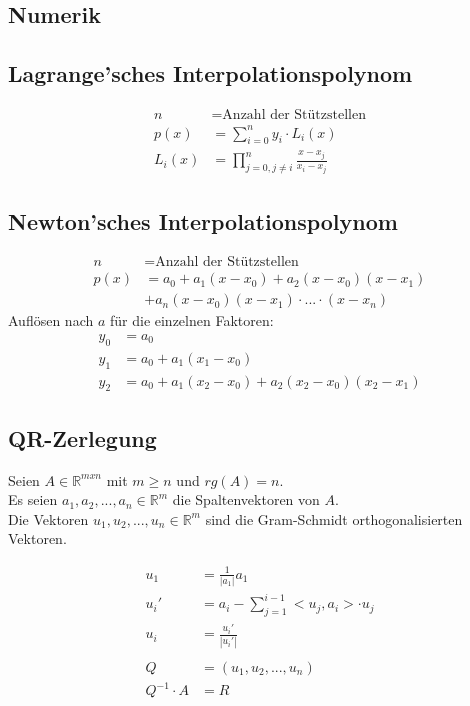 \documentclass[a4paper, landscape, 10pt]{article}
\begin{document}
\begin{multicols}{4}
\begin{small}
	\section{Numerik}
		\subsection{Lagrange'sches Interpolationspolynom}
			\begin{align*}
			n &= \text{Anzahl der Stützstellen}\\
			p(x) &= \sum_{i=0}^{n} y_i \cdot L_i(x) \\
			L_i(x) &= \prod_{j = 0, j \neq i}^{n} \frac{x - x_j}{x_i - x_j}
			\end{align*}
		\subsection{Newton'sches Interpolationspolynom}
			\begin{align*}
			n &= \text{Anzahl der Stützstellen}\\
			p(x) &= a_0 + a_1(x - x_0) + a_2(x - x_0)(x - x_1)\\
			     &+ a_n(x-x_0)(x - x_1)\cdot ... \cdot (x - x_n)
			\end{align*}
			     Auflösen nach $a$ für die einzelnen Faktoren:
			\begin{align*}
			y_0 &= a_0\\
			y_1 &= a_0 + a_1(x_1 - x_0)	\\
			y_2 &= a_0 + a_1(x_2 - x_0) + a_2(x_2 - x_0)(x_2 - x_1)
			\end{align*}
		\subsection{QR-Zerlegung}
			Seien $A \in \mathbb{R}^{mxn}$ mit $m \ge n$ und $rg(A) = n$.\\
			 Es seien $a_1, a_2, ..., a_n \in \mathbb{R}^m$ die Spaltenvektoren von $A$. \\
			 Die Vektoren $u_1, u_2, ..., u_n \in \mathbb{R}^m$ sind die Gram-Schmidt orthogonalisierten Vektoren.
			 
			 \begin{align*}
			 	u_1 &= \frac{1}{|a_1|} a_1\\
			 	u_i' &= a_i - \sum_{j = 1}^{i-1} <u_j, a_i> \cdot u_j\\
			 	u_i &= \frac{u_i'}{|u_i'|}
			 	\\\\
			 	Q &= (u_1, u_2, ..., u_n)\\
			 	Q^{-1}\cdot A &= R 
			 	\end{align*}

\end{small}
\end{multicols}
\end{document}
